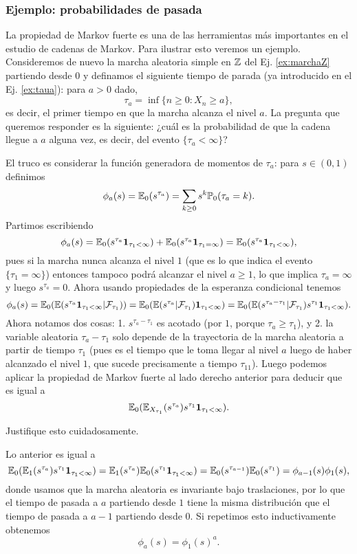 \subsubsection{Ejemplo: probabilidades de pasada}

La propiedad de Markov fuerte es una de las herramientas más importantes en el estudio de cadenas de Markov.
Para ilustrar esto veremos un ejemplo.
Consideremos de nuevo la marcha aleatoria simple en $\mathbb{Z}$ del Ej. \ref{ex:marchaZ} partiendo desde $0$ y definamos el siguiente tiempo de parada (ya introducido en el Ej. \ref{ex:taua}): para $a>0$ dado,
\[\tau_{a}=\inf\{n\geq0\!:X_n\geq a\},\]
es decir, el primer tiempo en que la marcha alcanza el nivel $a$.
La pregunta que queremos responder es la siguiente: ¿cuál es la probabilidad de que la cadena llegue a $a$ alguna vez, es decir, del evento $\{\tau_a<\infty\}$?

El truco es considerar la función generadora de momentos de $\tau_a$: para $s\in(0,1)$ definimos
\begin{equation}\label{eq:phia}
\phi_a(s)=\mathbb{E}_0(s^{\tau_a})=\sum_{k\geq0}s^k\mathbb{P}_0(\tau_a=k).
\end{equation}
Partimos escribiendo
\[\phi_a(s)=\mathbb{E}_0(s^{\tau_a}\mathbf{1}_{\tau_1<\infty})+\mathbb{E}_0(s^{\tau_a}\mathbf{1}_{\tau_1=\infty})=\mathbb{E}_0(s^{\tau_a}\mathbf{1}_{\tau_1<\infty}),\]
pues si la marcha nunca alcanza el nivel $1$ (que es lo que indica el evento $\{\tau_1=\infty\}$) entonces tampoco podrá alcanzar el nivel $a\geq1$, lo que implica $\tau_a=\infty$ y luego $s^{\tau_a}=0$.
Ahora usando propiedades de la esperanza condicional tenemos
\[\phi_a(s)=\mathbb{E}_0(\mathbb{E}(s^{\tau_a}\mathbf{1}_{\tau_1<\infty}|\mathcal{F}_{\tau_1}))=\mathbb{E}_0(\mathbb{E}(s^{\tau_a}|\mathcal{F}_{\tau_1})\mathbf{1}_{\tau_1<\infty})=\mathbb{E}_0(\mathbb{E}(s^{\tau_a-\tau_1}|\mathcal{F}_{\tau_1})s^{\tau_1}\mathbf{1}_{\tau_1<\infty}).\]
Ahora notamos dos cosas: 1. $s^{\tau_a-\tau_1}$ es acotado (por $1$, porque $\tau_a\geq\tau_1$), y 2. la variable aleatoria $\tau_a-\tau_1$ solo depende de la trayectoria de la marcha aleatoria a partir de tiempo $\tau_1$ (pues es el tiempo que le toma llegar al nivel $a$ luego de haber alcanzado el nivel $1$, que sucede precisamente a tiempo $\tau_11$).
Luego podemos aplicar la propiedad de Markov fuerte al lado derecho anterior para deducir que es igual a
\[\mathbb{E}_0(\mathbb{E}_{X_{\tau_1}}(s^{\tau_a})s^{\tau_1}\mathbf{1}_{\tau_1<\infty}).\]

\begin{exer}
Justifique esto cuidadosamente.
\end{exer}

Lo anterior es igual a
\[\mathbb{E}_0(\mathbb{E}_{1}(s^{\tau_a})s^{\tau_1}\mathbf{1}_{\tau_1<\infty})=\mathbb{E}_{1}(s^{\tau_a})\mathbb{E}_0(s^{\tau_1}\mathbf{1}_{\tau_1<\infty})=\mathbb{E}_{0}(s^{\tau_{a-1}})\mathbb{E}_0(s^{\tau_1})=\phi_{a-1}(s)\phi_1(s),\]
donde usamos que la marcha aleatoria es invariante bajo traslaciones, por lo que el tiempo de pasada a $a$ partiendo desde $1$ tiene la misma distribución que el tiempo de pasada a $a-1$ partiendo desde $0$.
Si repetimos esto inductivamente obtenemos 
\[\phi_a(s)=\phi_1(s)^a.\]

